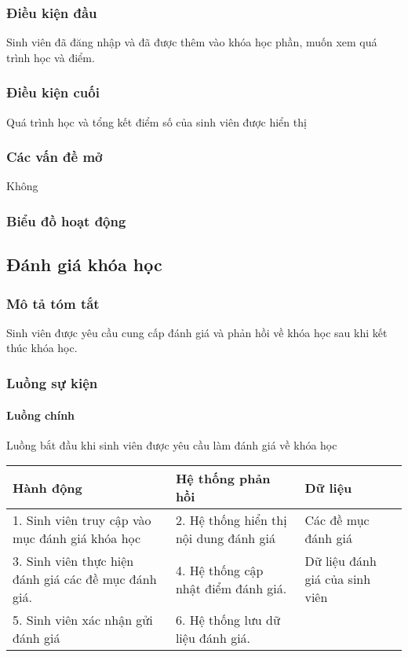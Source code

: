 \documentclass[./../main_file.tex]{subfiles}
\begin{document}
\subsubsection{Điều kiện đầu}
Sinh viên đã đăng nhập và đã được thêm vào khóa học phần, muốn xem quá trình học và điểm.

\subsubsection{Điều kiện cuối}
Quá trình học và tổng kết điểm số của sinh viên được hiển thị

\subsubsection{Các vấn đề mở}
Không

\subsubsection{Biểu đồ hoạt động}

\subsection{Đánh giá khóa học}
\subsubsection{Mô tả tóm tắt}
Sinh viên được yêu cầu cung cấp đánh giá và phản hồi về khóa học sau khi kết thúc khóa học.

\subsubsection{Luồng sự kiện}
\paragraph{Luồng chính}
Luồng bắt đầu khi sinh viên được yêu cầu làm đánh giá về khóa học
\begin{table}[H]
				\begin{tabular}{|p{.33\textwidth}|p{}|p{}|}
		\hline
		\textbf{Hành động}              & \textbf{Hệ thống phản hồi}     & \textbf{Dữ liệu} \\ \hline
		1. Sinh viên truy cập vào mục đánh giá khóa học       & 2. Hệ thống hiển thị nội dung đánh giá & Các đề mục đánh giá            \\ \hline
		3. Sinh viên thực hiện đánh giá các đề mục đánh giá. & 4. Hệ thống cập nhật điểm đánh giá.    & Dữ liệu đánh giá của sinh viên \\ \hline
		5. Sinh viên xác nhận gửi đánh giá & 6. Hệ thống lưu dữ liệu đánh giá. &                  \\ \hline
	\end{tabular}
\end{table}
\end{document}
